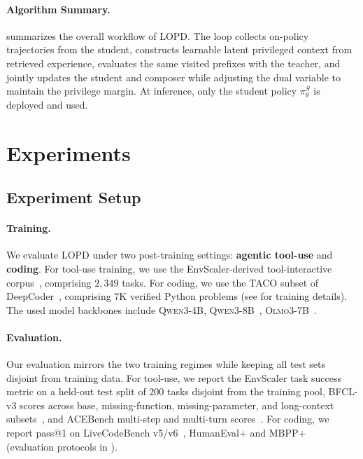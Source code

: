 \documentclass{article} %
\newcommand{\llmname}[1]{\textsc{#1}}
\newcommand{\ourmethod}{{\textsc{LOPD}}\xspace}
\begin{document}
\vspace{-0.6em}
\paragraph{Algorithm Summary.}
 summarizes the overall workflow of \ourmethod. The loop collects on-policy trajectories from the student, constructs learnable latent privileged context from retrieved experience, evaluates the same visited prefixes with the teacher, and jointly updates the student and composer while adjusting the dual variable to maintain the privilege margin. At inference, only the student policy $\pi_\theta^S$ is deployed and used.



\vspace{-0.4em}
\section{Experiments}
\vspace{-0.4em}
\subsection{Experiment Setup}
\vspace{-0.6em}
\paragraph{Training.}
We evaluate \ourmethod under two post-training settings:  \textbf{agentic tool-use} and  \textbf{coding}. For tool-use training, we use the EnvScaler-derived tool-interactive corpus~\citep{song2026envscalerscalingtoolinteractiveenvironments}, comprising $2{,}349$ tasks. For coding, we use the TACO subset of DeepCoder~\citep{togetherDeepCoderFully}, comprising $7$K verified Python problems (see  for training details). The used model backbones include \llmname{Qwen3-4B}, \llmname{Qwen3-8B}~\citep{yang2025qwen3}, \llmname{Olmo3-7B}~\citep{olmo2026olmo3}. 


\vspace{-0.7em}
\paragraph{Evaluation.}
Our evaluation mirrors the two training regimes while keeping all test sets disjoint from training data. For tool-use, we report the EnvScaler task success metric on a held-out test split of $200$ tasks disjoint from the training pool, BFCL-v3 scores across base, missing-function, missing-parameter, and long-context subsets~\citep{patil2025bfcl}, and ACEBench multi-step and multi-turn scores~\citep{chen2025acebenchwinsmatchpoint}. For coding, we report pass@1 on LiveCodeBench v5/v6~\citep{jain2024livecodebench}, HumanEval+ and MBPP+~\citep{liu2023codegeneratedchatgptreally} (evaluation protocols in ).
\end{document}
